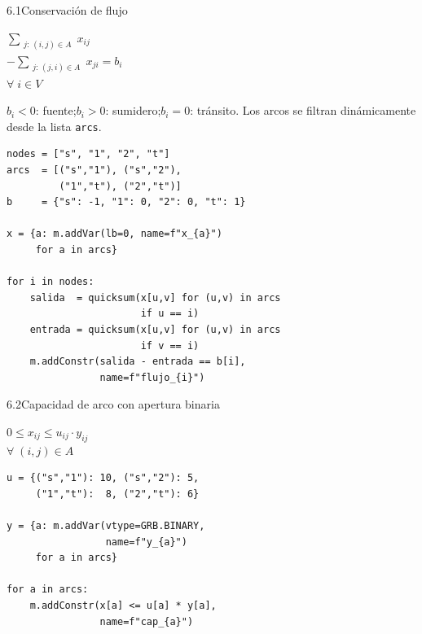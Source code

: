 \documentclass[10pt,a4paper]{article}
\newlength{\mathcolw}
\newlength{\codecolw}
\newcommand{\entryheader}[1]{%
  \needspace{5cm}%
  \vspace{6pt}%
  \noindent%
  \begin{tcolorbox}[
    colback=subsecbg!18,
    colframe=subsecbg!45,
    sharp corners, boxrule=0.4pt,
    left=5pt, right=5pt, top=2pt, bottom=2pt,
    fontupper=\small\bfseries\sffamily,
  ]
  #1
  \end{tcolorbox}%
  \vspace{2pt}%
}
\newcommand{\py}[1]{\texttt{\small #1}}
\begin{document}
\entryheader{6.1\quad Conservaci\'on de flujo}
\noindent
\begin{minipage}[t]{\mathcolw}
    \begin{tcolorbox}[mathbox]
        $\displaystyle\sum_{\substack{j:\,(i,j)\in A}} x_{ij}$\\[4pt]
        $-\displaystyle\sum_{\substack{j:\,(j,i)\in A}} x_{ji} = b_i$\\[6pt]
        $\forall\; i \in V$
    \end{tcolorbox}
    \vspace{2pt}
    \begin{tcolorbox}[notebox]
        $b_i < 0$: fuente;\enspace $b_i > 0$: sumidero;\enspace $b_i = 0$: tr\'ansito. Los arcos se filtran din\'amicamente desde la lista \py{arcs}.
    \end{tcolorbox}
\end{minipage}\hspace{0.02\textwidth}%
\begin{minipage}[t]{\codecolw}
    \begin{lstlisting}[style=gurobipy]
nodes = ["s", "1", "2", "t"]
arcs  = [("s","1"), ("s","2"),
         ("1","t"), ("2","t")]
b     = {"s": -1, "1": 0, "2": 0, "t": 1}

x = {a: m.addVar(lb=0, name=f"x_{a}")
     for a in arcs}

for i in nodes:
    salida  = quicksum(x[u,v] for (u,v) in arcs
                       if u == i)
    entrada = quicksum(x[u,v] for (u,v) in arcs
                       if v == i)
    m.addConstr(salida - entrada == b[i],
                name=f"flujo_{i}")
\end{lstlisting}
\end{minipage}

\vspace{4pt}

\entryheader{6.2\quad Capacidad de arco con apertura binaria}
\noindent
\begin{minipage}[t]{\mathcolw}
    \begin{tcolorbox}[mathbox]
        $0 \leq x_{ij} \leq u_{ij} \cdot y_{ij}$\\[6pt]
        $\forall\; (i,j) \in A$
    \end{tcolorbox}
\end{minipage}\hspace{0.02\textwidth}%
\begin{minipage}[t]{\codecolw}
    \begin{lstlisting}[style=gurobipy]
u = {("s","1"): 10, ("s","2"): 5,
     ("1","t"):  8, ("2","t"): 6}

y = {a: m.addVar(vtype=GRB.BINARY,
                 name=f"y_{a}")
     for a in arcs}

for a in arcs:
    m.addConstr(x[a] <= u[a] * y[a],
                name=f"cap_{a}")
\end{lstlisting}
\end{minipage}
\end{document}
